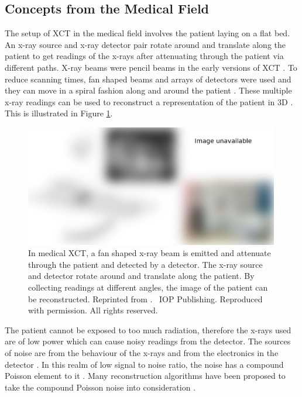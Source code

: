 \subsection{Concepts from the Medical Field}

The setup of XCT \citep{cormack1973reconstruction, hounsfield1973computerized, hounsfield1980computed} in the medical field involves the patient laying on a flat bed. An x-ray source and x-ray detector pair rotate around and translate along the patient to get readings of the x-rays after attenuating through the patient via different paths. X-ray beams were pencil beams in the early versions of XCT \citep{michael2001x}. To reduce scanning times, fan shaped beams and arrays of detectors were used and they can move in a spiral fashion along and around the patient \citep{cierniak2011x}. These multiple x-ray readings can be used to reconstruct a representation of the patient in 3D \citep{zeng2010medical}. This is illustrated in Figure \ref{fig:literature_medicalct}.

\begin{figure}
  \centering
  \includegraphics[width=0.99\textwidth]{../figures/literatureReview/literature_medicalct.png}
  \caption{In medical XCT, a fan shaped x-ray beam is emitted and attenuate through the patient and detected by a detector. The x-ray source and detector rotate around and translate along the patient. By collecting readings at different angles, the image of the patient can be reconstructed. Reprinted from \cite{michael2001x}. \textcopyright\ IOP Publishing. Reproduced with permission. All rights reserved.}
  \label{fig:literature_medicalct}
\end{figure}

The patient cannot be exposed to too much radiation, therefore the x-rays used are of low power which can cause noisy readings from the detector. The sources of noise are from the behaviour of the x-rays and from the electronics in the detector \citep{yang2010noise}. In this realm of low signal to noise ratio, the noise has a compound Poisson element to it \citep{whiting2002signal, whiting2006properties}. Many reconstruction algorithms have been proposed to take the compound Poisson noise into consideration \citep{elbakri2002statistical, elbakri2003efficient, elbakri2003statistical, lasio2007statistical, xie2008x}.

